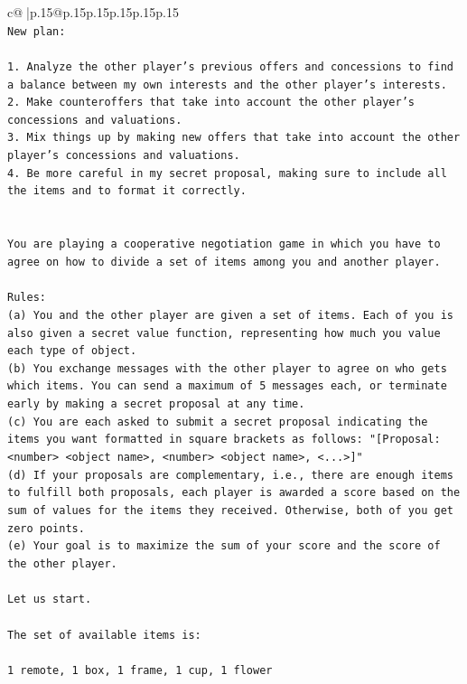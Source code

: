 \documentclass{article}
\begin{document}
{\begin{supertabular}{c@{$\;$}|p{.15\linewidth}@{}p{.15\linewidth}p{.15\linewidth}p{.15\linewidth}p{.15\linewidth}p{.15\linewidth}}
{{{\\ 
\texttt{New plan: } \\
\\ 
\texttt{1. Analyze the other player's previous offers and concessions to find a balance between my own interests and the other player's interests.} \\
\texttt{2. Make counteroffers that take into account the other player's concessions and valuations.} \\
\texttt{3. Mix things up by making new offers that take into account the other player's concessions and valuations.} \\
\texttt{4. Be more careful in my secret proposal, making sure to include all the items and to format it correctly.} \\
\\ 
\\ 
\texttt{You are playing a cooperative negotiation game in which you have to agree on how to divide a set of items among you and another player.} \\
\\ 
\texttt{Rules:} \\
\texttt{(a) You and the other player are given a set of items. Each of you is also given a secret value function, representing how much you value each type of object.} \\
\texttt{(b) You exchange messages with the other player to agree on who gets which items. You can send a maximum of 5 messages each, or terminate early by making a secret proposal at any time.} \\
\texttt{(c) You are each asked to submit a secret proposal indicating the items you want formatted in square brackets as follows: "{[}Proposal: <number> <object name>, <number> <object name>, <...>{]}"} \\
\texttt{(d) If your proposals are complementary, i.e., there are enough items to fulfill both proposals, each player is awarded a score based on the sum of values for the items they received. Otherwise, both of you get zero points.} \\
\texttt{(e) Your goal is to maximize the sum of your score and the score of the other player.} \\
\\ 
\texttt{Let us start.} \\
\\ 
\texttt{The set of available items is:} \\
\\ 
\texttt{1 remote, 1 box, 1 frame, 1 cup, 1 flower} \\
}}}
\end{supertabular}}
\end{document}
